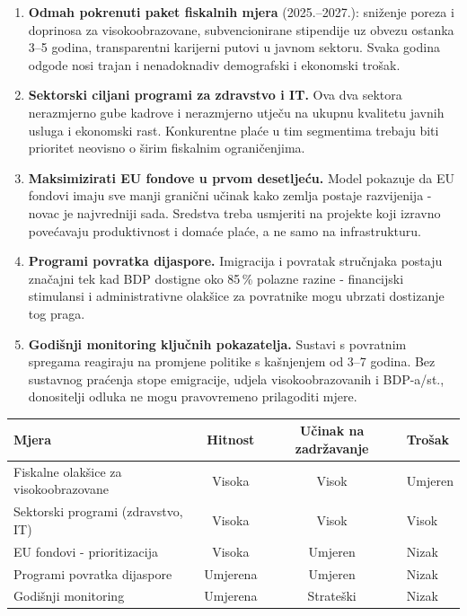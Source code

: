 \documentclass[11pt,a4paper]{article}
\begin{document}
\begin{enumerate}[noitemsep, topsep=3pt, leftmargin=1.5em]
  \item \textbf{Odmah pokrenuti paket fiskalnih mjera} (2025.–2027.): sniženje poreza i doprinosa za visokoobrazovane, subvencionirane stipendije uz obvezu ostanka 3–5 godina, transparentni karijerni putovi u javnom sektoru. Svaka godina odgode nosi trajan i nenadoknadiv demografski i ekonomski trošak.

  \item \textbf{Sektorski ciljani programi za zdravstvo i IT.} Ova dva sektora nerazmjerno gube kadrove i nerazmjerno utječu na ukupnu kvalitetu javnih usluga i ekonomski rast. Konkurentne plaće u tim segmentima trebaju biti prioritet neovisno o širim fiskalnim ograničenjima.

  \item \textbf{Maksimizirati EU fondove u prvom desetljeću.} Model pokazuje da EU fondovi imaju sve manji granični učinak kako zemlja postaje razvijenija  - novac je najvredniji sada. Sredstva treba usmjeriti na projekte koji izravno povećavaju produktivnost i domaće plaće, a ne samo na infrastrukturu.

  \item \textbf{Programi povratka dijaspore.} Imigracija i povratak stručnjaka postaju značajni tek kad BDP dostigne oko 85\,\% polazne razine  - financijski stimulansi i administrativne olakšice za povratnike mogu ubrzati dostizanje tog praga.

  \item \textbf{Godišnji monitoring ključnih pokazatelja.} Sustavi s povratnim spregama reagiraju na promjene politike s kašnjenjem od 3–7 godina. Bez sustavnog praćenja stope emigracije, udjela visokoobrazovanih i BDP-a/st., donositelji odluka ne mogu pravovremeno prilagoditi mjere.
\end{enumerate}

\begin{center}
\small
\begin{tabular}{lccl}
\toprule
\textbf{Mjera} & \textbf{Hitnost} & \textbf{Učinak na zadržavanje} & \textbf{Trošak} \\
\midrule
Fiskalne olakšice za visokoobrazovane & Visoka   & Visok     & Umjeren \\
Sektorski programi (zdravstvo, IT)    & Visoka   & Visok     & Visok   \\
EU fondovi  - prioritizacija           & Visoka   & Umjeren   & Nizak   \\
Programi povratka dijaspore           & Umjerena & Umjeren   & Nizak   \\
Godišnji monitoring                   & Umjerena & Strateški & Nizak   \\
\bottomrule
\end{tabular}
\end{center}
\end{document}
